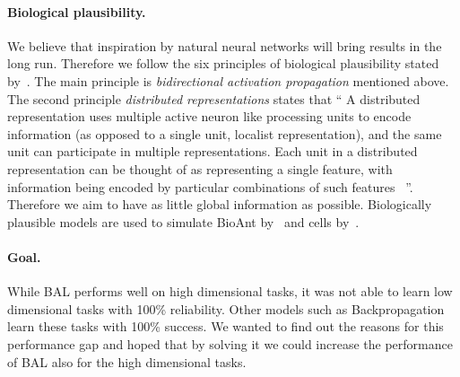 \paragraph{Biological plausibility.} We believe that inspiration by natural neural networks will bring results in the long run. Therefore we follow the six principles of biological plausibility stated by~\citet{hinton1988learning}. The main principle is \emph{bidirectional activation propagation} mentioned above. The second principle \emph{distributed representations} states that \enquote{
  A distributed representation uses multiple active neuron like processing units to encode information (as opposed to a single unit, localist representation), and the same unit can participate in multiple representations. Each unit in a distributed representation can be thought of as representing a single feature, with information being encoded by particular combinations of such features~\citep[pp.~ 456]{o1998six}
}. Therefore we aim to have as little global information as possible. Biologically plausible models are used to simulate BioAnt by~\citet{schneider2009application} and cells by~\citet{nawrocki2012monitoring}. 

\paragraph{Goal.}
While BAL performs well on high dimensional tasks, it was not able to learn low dimensional tasks with 100\% reliability. Other models such as Backpropagation~\citep{rumelhart1986learning} learn these tasks with 100\% success. We wanted to find out the reasons for this performance gap and hoped that by solving it we could increase the performance of BAL also for the high dimensional tasks. 



